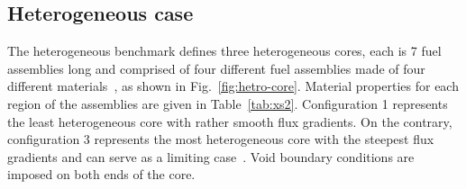 \subsection{Heterogeneous case}
\label{subsec:heterog}

The heterogeneous benchmark defines three heterogeneous cores, each is 7 fuel assemblies long and comprised of four different fuel assemblies made of four different materials~\cite{Rahnema-1997}, as shown in Fig.~\ref{fig:hetro-core}. Material properties for each region of the assemblies are given in Table~\ref{tab:xs2}. Configuration 1 represents the least heterogeneous core with rather smooth flux gradients. On the contrary, configuration 3 represents the most heterogeneous core with the steepest flux gradients and can serve as a limiting case~\cite{Rahnema-1997}. Void boundary conditions are imposed on both ends of the core. 


